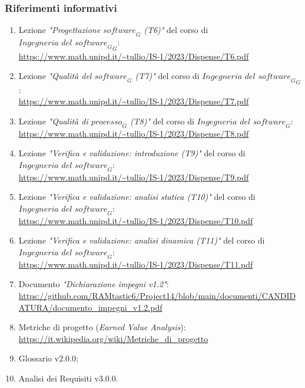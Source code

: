 \subsubsection{Riferimenti informativi}
\label{sec:rif_inf}
\begin{enumerate}
    \item Lezione \emph{"Progettazione $\textit{software}_G$ (T6)"} del corso di $\textit{Ingegneria del $\textit{software}_G$}_G$: \\
    \url{https://www.math.unipd.it/~tullio/IS-1/2023/Dispense/T6.pdf}
    \item Lezione \emph{"Qualità del $\textit{software}_G$ (T7)"} del corso di $\textit{Ingegneria del $\textit{software}_G$}_G$: \\
    \url{https://www.math.unipd.it/~tullio/IS-1/2023/Dispense/T7.pdf}
    \item Lezione \emph{"Qualità di $\textit{processo}_G$ (T8)"} del corso di $\textit{Ingegneria del software}_G$: \\
    \url{https://www.math.unipd.it/~tullio/IS-1/2023/Dispense/T8.pdf}
    \item Lezione \emph{"Verifica e validazione: introduzione (T9)"} del corso di $\textit{Ingegneria del software}_G$: \\
    \url{https://www.math.unipd.it/~tullio/IS-1/2023/Dispense/T9.pdf}
    \item Lezione \emph{"Verifica e validazione: analisi statica (T10)"} del corso di $\textit{Ingegneria del software}_G$: \\
    \url{https://www.math.unipd.it/~tullio/IS-1/2023/Dispense/T10.pdf}
    \item Lezione \emph{"Verifica e validazione: analisi dinamica (T11)"} del corso di $\textit{Ingegneria del software}_G$: \\
    \url{https://www.math.unipd.it/~tullio/IS-1/2023/Dispense/T11.pdf}
     \item Documento \emph{"Dichiarazione impegni v1.2"}: \\ \url{https://github.com/RAMtastic6/Project14/blob/main/documenti/CANDIDATURA/documento_impegni_v1.2.pdf}
     \item Metriche di progetto (\emph{Earned Value Analysis}):\\
     \url{https://it.wikipedia.org/wiki/Metriche_di_progetto}
     \item Glossario v2.0.0;
     \item Analisi dei Requisiti v3.0.0.
\end{enumerate}
